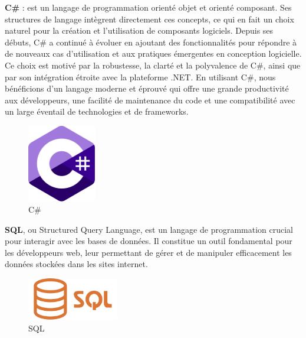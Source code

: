 \textbf{C\#} : est un langage de programmation orienté objet et orienté composant. Ses structures de langage intègrent directement ces concepts, ce qui en fait un choix naturel pour la création et l'utilisation de composants logiciels. Depuis ses débuts, C\# a continué à évoluer en ajoutant des fonctionnalités pour répondre à de nouveaux cas d'utilisation et aux pratiques émergentes en conception logicielle. Ce choix est motivé par la robustesse, la clarté et la polyvalence de C\#, ainsi que par son intégration étroite avec la plateforme .NET. En utilisant C\#, nous bénéficions d'un langage moderne et éprouvé qui offre une grande productivité aux développeurs, une facilité de maintenance du code et une compatibilité avec un large éventail de technologies et de frameworks.
\\
\begin{figure}[H]
    \centering
    \includegraphics[width=3cm]{Figures/csharp.png}
    \caption{C\#}
\end{figure}


\textbf{SQL}, ou Structured Query Language, est un langage de programmation crucial pour interagir avec les bases de données. Il constitue un outil fondamental pour les développeurs web, leur permettant de gérer et de manipuler efficacement les données stockées dans les sites internet.
\\
\begin{figure}[H]
    \centering
    \includegraphics[width=4cm]{Figures/sql.png}
    \caption{SQL}
\end{figure}



